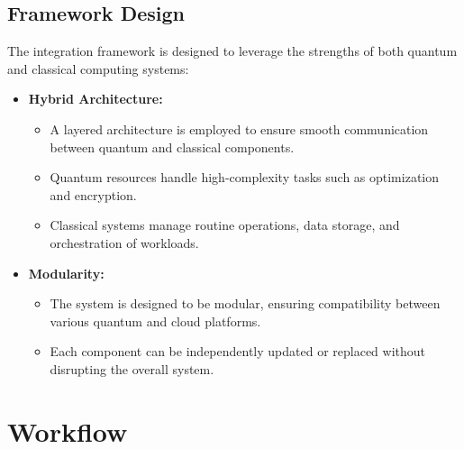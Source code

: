 \documentclass[12pt,a4paper]{article}
\begin{document}
\subsection{Framework Design}
The integration framework is designed to leverage the strengths of both quantum and classical computing systems:
\begin{itemize}
    \item \textbf{Hybrid Architecture:}
    \begin{itemize}
        \item A layered architecture is employed to ensure smooth communication between quantum and classical components.
        \item Quantum resources handle high-complexity tasks such as optimization and encryption.
        \item Classical systems manage routine operations, data storage, and orchestration of workloads.
    \end{itemize}
    \item \textbf{Modularity:}
    \begin{itemize}
        \item The system is designed to be modular, ensuring compatibility between various quantum and cloud platforms.
        \item Each component can be independently updated or replaced without disrupting the overall system.
    \end{itemize}
\end{itemize}

\newpage

\begin{center}
    \fontsize{14}{16}\selectfont \bfseries
    \section{Workflow}
    \end{center}
\end{document}
